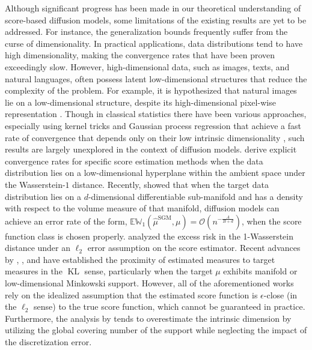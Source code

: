 \documentclass[12pts]{article}
\newcommand{\cO}{ \mathcal{O}}
\newcommand{\E}{\mathbb{E}}
\newcommand{\fW}{\mathbb{W}}
\begin{document}
Although significant progress has been made in our theoretical understanding of score-based diffusion models, some limitations of the existing results are yet to be addressed. For instance, the generalization bounds frequently suffer from the curse of dimensionality. In practical applications, data distributions tend to have high dimensionality, making the convergence rates that have been proven exceedingly slow. However, high-dimensional data, such as images, texts, and natural languages, often possess latent low-dimensional structures that reduce the complexity of the problem. For example, it is hypothesized that natural images lie on a low-dimensional structure, despite its high-dimensional pixel-wise representation \citep{pope2020intrinsic}. Though in classical statistics there have been various approaches, especially using kernel tricks and Gaussian process regression that achieve a fast rate of convergence that depends only on their low intrinsic dimensionality \citep{bickel2007local,kim2019uniform}, such results are largely unexplored in the context of diffusion models. \citet{chen2023score} derive explicit convergence rates for specific score estimation methods when the data distribution lies on a low-dimensional hyperplane within the ambient space under the Wasserstein-$1$ distance.  Recently, \citet{pmlr-v238-tang24a} showed that when the target data distribution lies on a $d$-dimensional differentiable sub-manifold and has a density with respect to the volume measure of that manifold, diffusion models can achieve an error rate of the form,  $\E \fW_1\left(\hat{\mu}^{\text{SGM}}, \mu\right) = \cO \left(n^{-\frac{A}{B + d}}\right)$, when the score function class is chosen properly. \citet{debortoli2022convergence} analyzed the excess risk in the 1-Wasserstein distance under an $\ell_2$ error assumption on the score estimator. 
Recent advances by \citet{huang2024denoising}, \citet{potaptchik2024linear}, and \citet{Kadkhodaie26a} have established the proximity of estimated measures to target measures in the $\operatorname{KL}$ sense, particularly when the target $\mu$ exhibits manifold or low-dimensional Minkowski support. However, all of the aforementioned works rely on the idealized assumption that the estimated score function is $\epsilon$-close (in the $\ell_2$ sense) to the true score function, which cannot be guaranteed in practice. Furthermore, the analysis by \citet{Kadkhodaie26a} tends to overestimate the intrinsic dimension by utilizing the global covering number of the support while neglecting the impact of the discretization error.
\end{document}
